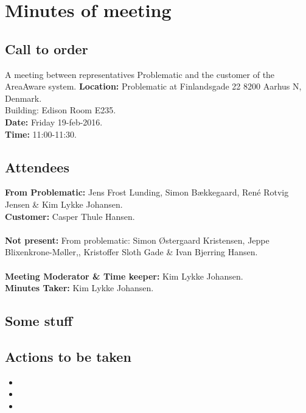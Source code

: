 %
\thispagestyle{fancy}
\chapter*{Minutes of meeting}

\section*{Call to order}
A meeting between representatives Problematic and the customer of the AreaAware system.
\textbf{Location:} Problematic at Finlandsgade 22 8200 Aarhus N, Denmark.\\ Building: Edison Room E235.\\
\textbf{Date:} Friday 19-feb-2016. \\
\textbf{Time:} 11:00-11:30.

\section*{Attendees}
\textbf{From Problematic:} Jens Frost Lunding, Simon Bækkegaard, René Rotvig Jensen \& Kim Lykke Johansen.\\
\textbf{Customer:} Casper Thule Hansen.\\\\
\textbf{Not present:} From problematic: Simon Østergaard Kristensen, Jeppe Blixenkrone-Møller,, Kristoffer Sloth Gade \& Ivan Bjerring Hansen.\\\\
\textbf{Meeting Moderator \& Time keeper:} Kim Lykke Johansen. \\
\textbf{Minutes Taker:} Kim Lykke Johansen.

\section*{Some stuff}


\section*{Actions to be taken}
\begin{itemize}
    \item 
    \item 
    \item 
\end{itemize}
